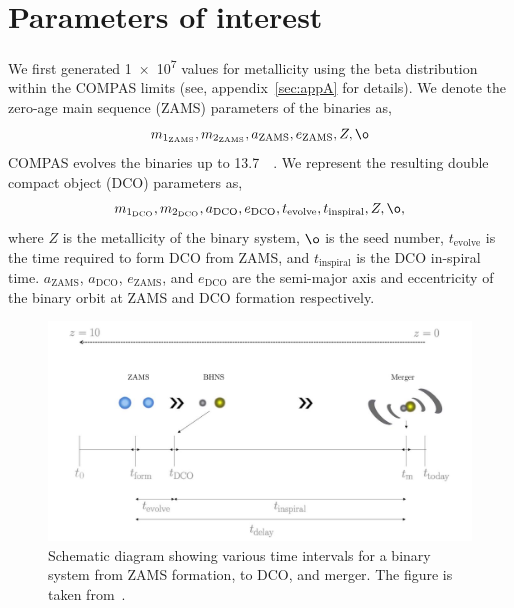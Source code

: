 \documentclass[12pt, journal, onecolumn]{IEEEtran}
\newcommand{\mone}[1]{m_{1_{\text{#1}}}}
\newcommand{\mtwo}[1]{m_{2_{\text{#1}}}}
\newcommand{\semaxis}[1]{a_{\text{#1}}}
\newcommand{\ecc}[1]{e_\text{#1}}
\newcommand{\interval}[1]{t_\text{#1}}
\begin{document}
    \section{Parameters of interest}
    \label{sec:parameters-of-interest}
    We first generated \num{1e7} values for metallicity using the beta distribution within the COMPAS limits (see, appendix~\ref{sec:appA} for details).
    We denote the zero-age main sequence (ZAMS) parameters of the binaries as,
    \begin{equation}%
        \mone{ZAMS}, \mtwo{ZAMS}, \semaxis{ZAMS}, \ecc{ZAMS}, Z, \o
        \label{eq:zams_parameter_names}
    \end{equation}%
    COMPAS evolves the binaries up to \SI{13.7}{\giga\yr}.
    We represent the resulting double compact object (DCO) parameters as,
    \begin{equation}%
        \mone{DCO}, \mtwo{DCO}, \semaxis{DCO}, \ecc{DCO}, \interval{evolve}, \interval{inspiral}, Z, \o,
        \label{eq:dco_parameter_names}
    \end{equation}%
    where $Z$ is the metallicity of the binary system, $\o$ is the seed number, $\interval{evolve}$ is the time required to form DCO from ZAMS, and $\interval{inspiral}$ is the DCO in-spiral time. $\semaxis{ZAMS}$, $\semaxis{DCO}$, $\ecc{ZAMS}$, and $\ecc{DCO}$ are the semi-major axis and eccentricity of the binary orbit at ZAMS and DCO formation respectively.
    \begin{figure}[!ht]%
        \centering
        \includegraphics[width=\linewidth]{images/binary_evolution}
        \caption{Schematic diagram showing various time intervals for a binary system from ZAMS formation, to DCO, and merger. The figure is taken from~\cite{Riley2022}.}
        \label{fig:binaryevolution}
    \end{figure}%
\end{document}
